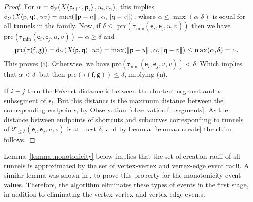 \documentclass[12pt]{article}
\newcommand{\lemref}[1]{Lemma~\ref{lemma:#1}}
\newcommand{\obsref}[1]{Observation~\ref{observation:#1}}
\newcommand{\ts}{\hspace{0.6pt}}
\newcommand{\Frechet}{Fr\'{e}c{h}e{}t\xspace}\providecommand{\Arr}{\mathop{\mathrm{\EuScript{A}}}}
\newcommand{\distFr}[2]{\mathsf{d}_{\EuScript{F}}\pth{#1, #2}}
\newcommand{\distX}[2]{\distCmd{#1 - #2}}
\newcommand{\pnt}{\mathsf{p}}
\newcommand{\pntA}{\mathsf{q}}
\newcommand{\pntF}{\mathsf{f}}
\newcommand{\pntG}{\mathsf{g}}
\newcommand{\SimplifyX}[1]{#1}
\newcommand{\cXBase}{X} \newcommand{\cYBase}{Y} \newcommand{\crvCBase}{{\pi}}
\newcommand{\cX}{\SimplifyX{\cXBase}}
\providecommand{\pth}[2][\!]{#1\left({#2}\right)}
\newcommand{\SC}[3]{{#1}\!\!\ts\ts \left\langle  #2, #3 \right\rangle}
\newcommand{\edge}{\mathsf{e}}
\newcommand{\tunnels}{tunnels\xspace}
\newcommand{\tunnelLtr}{\mathsf{\tau}}
\newcommand{\xtunnel}[2]{\tunnelLtr\pth{ #1,  #2}}
\newcommand{\xTunnelsLeq}[5]{\mathcal{T}_{\leq #5}\pth{#1, #2, #3, #4}}
\newcommand{\scPrice}[2]{{\mathrm{p{r}c}}\pth{\xtunnel{#1}{#2}}}
\newcommand{\bCanonical}[4]{\mathrm{\tau}_{\min}\pth{#1, #2, #3,#4}}
\newcommand{\priceX}[1]{\mathrm{p{r}c}\pth{#1}}
\numberwithin{figure}{section}
\numberwithin{equation}{section}
\begin{document}
\begin{proof}
    For $\alpha = \distFr{\SC{\cX}{\pnt_{i+1}}{\pnt_{j}}} {u_\alpha
       v_\alpha}$, this implies $\distFr{\SC{\cX}{\pnt}{\pntA}}{uv} =
    \max ( \distX{\pnt}{u}, \alpha, \distX{\pntA}{v})$, where $\alpha
    \leq \max( \alpha, \delta)$ is equal for all \tunnels in the
    family.  Now, if $\delta \leq$ $
    \priceX{\bCanonical{\edge_i}{\edge_j}{u}{v}}$ then we have
    $\priceX{\bCanonical{\edge_i}{\edge_j}{u}{v}}=\alpha \geq \delta$
    and
    \begin{align*}
        \scPrice{\pntF}{\pntG} = \distFr{\SC{\cX}{\pnt}{\pntA}}{uv} =
        \max(\distX{\pnt}{u}, \alpha, \distX{\pntA}{v}) \leq
        \max(\alpha,\delta) =\alpha.
    \end{align*}This proves (i).  Otherwise, we have
    $\priceX{\bCanonical{\edge_i}{\edge_j}{u}{v}} < \delta$. Which
    implies that $\alpha < \delta$, but then $\scPrice{\pntF}{\pntG}
    \leq \delta$, implying (ii).
    
    If $i = j$ then the \Frechet distance is between the shortcut
    segment and a subsegment of $\edge_i$. But this distance is the
    maximum distance between the corresponding endpoints, by
    \obsref{f:r:segments}. As the distance between endpoints of
    shortcuts and subcurves corresponding to \tunnels of
    $\xTunnelsLeq{\edge_i}{\edge_j}{u}{v}{\delta}$ is at most
    $\delta$, and by \lemref{r:create} the claim follows.
\end{proof}




\lemref{monotonicity} below implies that the set of creation radii of
all \tunnels is approximated by the set of vertex-vertex and
vertex-edge event radii.  A similar lemma was shown in
\cite{dhw-afdrc-12}, to prove this property for the monotonicity event
values. Therefore, the algorithm eliminates these types of events in
the first stage, in addition to eliminating the vertex-vertex and
vertex-edge events.
\end{document}
